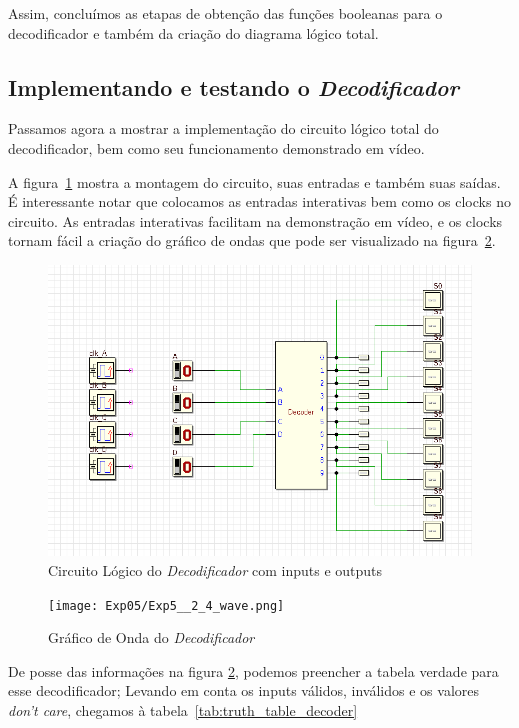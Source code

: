 \documentclass[12pt]{article}
\begin{document}
Assim, concluímos as etapas de obtenção das funções booleanas para o
decodificador e também da criação do diagrama lógico total.

\subsection{Implementando e testando o \emph{Decodificador}}\label{sec:2.4}

Passamos agora a mostrar a implementação do circuito lógico total do
decodificador, bem como seu funcionamento demonstrado em vídeo.

A figura~\ref{fig:Exp5__2_4_circuit.png} mostra a montagem do circuito, suas
entradas e também suas saídas. É interessante notar que colocamos as entradas
interativas bem como os clocks no circuito. As entradas interativas facilitam na
demonstração em vídeo, e os clocks tornam fácil a criação do gráfico de ondas
que pode ser visualizado na figura~\ref{fig:Exp5__2_4_wave.png}.

\begin{figure}[htp]
    \centering
    \includegraphics[width=12cm]{Exp05/Exp5__2_4_circuit.png}
    \caption{Circuito Lógico do \emph{Decodificador} com inputs e outputs}
    \label{fig:Exp5__2_4_circuit.png}
\end{figure}

\begin{figure}[htp]
    \centering
    \texttt{[image: Exp05/Exp5\_\_2\_4\_wave.png]}
    \caption{Gráfico de Onda do \emph{Decodificador}}
    \label{fig:Exp5__2_4_wave.png}
\end{figure}

De posse das informações na figura \ref{fig:Exp5__2_4_wave.png}, podemos
preencher a tabela verdade para esse decodificador; Levando em conta os inputs
válidos, inválidos e os valores \emph{don't care}, chegamos à
tabela~\ref{tab:truth_table_decoder}
\end{document}
